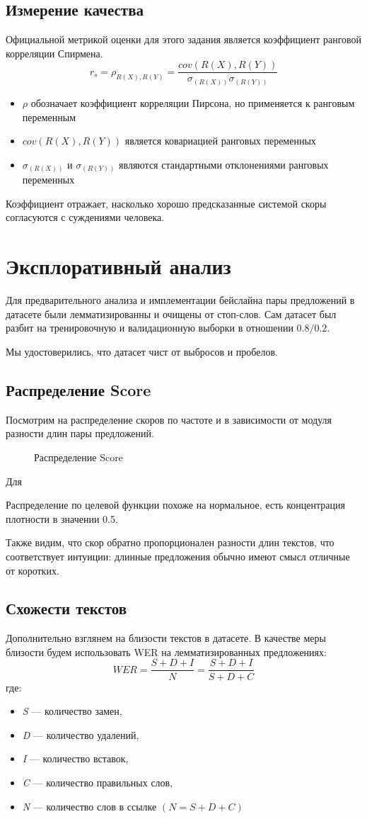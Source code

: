 \documentclass[12pt]{article}
\newcommand{\imgh}[3]
{
\begin{figure}[H]
\center{\texttt{[image: \#2]}}
\caption{#3}
\label{ris:#2}
\end{figure}
}
\begin{document}
\subsection{Измерение качества}
Официальной метрикой оценки для этого задания является коэффициент ранговой корреляции Спирмена.
$$
r_s = \rho_{R(X), R(Y)} = \frac{cov(R(X), R(Y))}{\sigma_{(R(X))} \sigma_{(R(Y))}}
$$
\begin{itemize}
    \item $\rho$ обозначает коэффициент корреляции Пирсона, но применяется к ранговым переменным
    \item $cov(R(X), R(Y))$ является ковариацией ранговых переменных
    \item $\sigma_{(R(X))}$ и $\sigma_{(R(Y))}$ являются стандартными отклонениями ранговых переменных
\end{itemize}
Коэффициент отражает, насколько хорошо предсказанные системой скоры согласуются с суждениями человека.

\newpage

\section{Эксплоративный анализ}
Для предварительного анализа и имплементации бейслайна пары предложений в датасете были лемматизированны и очищены от стоп-слов. Сам датасет был разбит на тренировочную и валидационную выборки в отношении $0.8 / 0.2$.

Мы удостоверились, что датасет чист от выбросов и пробелов.

\subsection{Распределение Score}
Посмотрим на распределение скоров по частоте и в зависимости от модуля разности длин пары предложений.
\imgh{17cm}{score_distribution.png}{Распределение Score}
Для


Распределение по целевой функции похоже на нормальное, есть концентрация плотности в значении 0.5. 

Также видим, что скор обратно пропорционален разности длин текстов, что соответствует интуиции: длинные предложения обычно имеют смысл отличные от коротких.
\newpage

\subsection{Схожести текстов}
Дополнительно взглянем на близости текстов в датасете. В качестве меры близости будем использовать WER на лемматизированных предложениях:
$$ WER = \frac{S + D + I}{N} =  \frac{S + D + I}{S + D + C}$$
где:
\begin{itemize}
    \item \textit{S} — количество замен,
    \item \textit{D} — количество удалений,
    \item \textit{I} — количество вставок,
    \item \textit{C} — количество правильных слов,
    \item \textit{N} — количество слов в ссылке $(N = S + D + C)$
\end{itemize}
\end{document}
